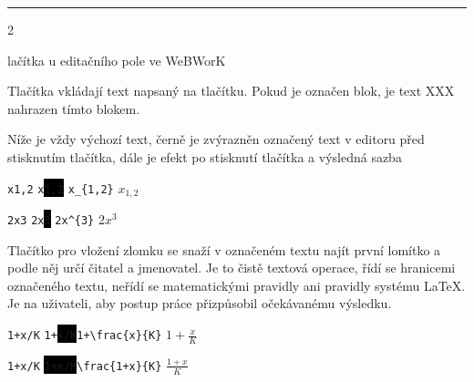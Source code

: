 \documentclass[10pt]{article}
\def\nadpis#1\par{\par\bigskip\noindent \textbf{#1} \par}
\def\polozka #1;#2;{\par $#1$\hfill \texttt{#2}\par\smallskip}
\begin{document}
\hrule

\begin{multicols}2

\nadpis Tlačítka u editačního pole ve WeBWorK

Tlačítka vkládají text napsaný na tlačítku. Pokud je označen blok, je text XXX nahrazen tímto blokem. 

Níže je vždy výchozí text, černě je zvýrazněn označený text v editoru před stisknutím tlačítka, dále je efekt po stisknutí tlačítka a výsledná sazba


\verb|x1,2|
\hfill
\texttt{x\colorbox{black}{\color{white}1,2}}
\hfill
\verb|x_{1,2}| \hfill $x_{1,2}$

\verb|2x3|
\hfill
\texttt{2x\colorbox{black}{\color{white}3}}
\hfill
\verb|2x^{3}| \hfill $2x^{3}$

Tlačítko pro vložení zlomku se snaží v označeném textu najít první lomítko a podle něj určí čitatel a jmenovatel. Je to čistě textová operace, řídí se hranicemi označeného textu, neřídí se matematickými pravidly ani pravidly systému \LaTeX. Je na uživateli, aby postup práce přizpůsobil očekávanému výsledku.



\def\polozka{\par}

\polozka \texttt{1+x/K}
\hfill \texttt{1+\colorbox{black}{\color{white}x/K}}\hfill \verb.1+\frac{x}{K}. \hfill $1+\frac xK$

\polozka \texttt{1+x/K}
\hfill \texttt{\colorbox{black}{\color{white}1+x/K}}\hfill \verb.\frac{1+x}{K}. \hfill $\frac {1+x}K$


\end{multicols}

\newpage


\lstset{language=TeX}
\lstset{basicstyle=\ttfamily,breaklines=true}

\end{document}
